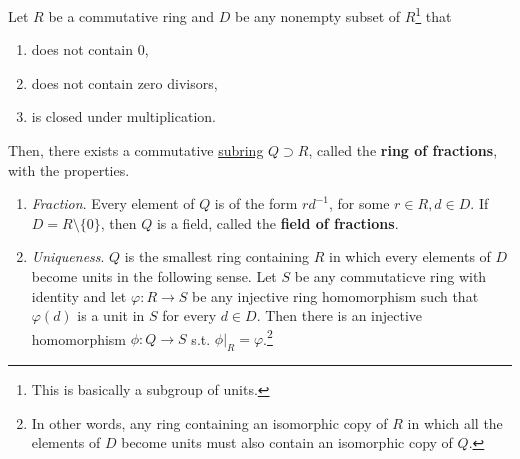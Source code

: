   \begin{definition}
    \label{def:ring-field-of-fractions}
    Let $R$ be a commutative ring and $D$ be any nonempty subset of $R$\footnote{This is basically a subgroup of units.} that 
    \begin{enumerate}
      \item does not contain $0$, 
      \item does not contain zero divisors, 
      \item is closed under multiplication. 
    \end{enumerate}
    Then, there exists a commutative \hyperref[def:subring]{subring} $Q \supset R$, called the \textbf{ring of fractions}, with the properties. 
    \begin{enumerate}
      \item \textit{Fraction}. Every element of $Q$ is of the form $r d^{-1}$, for some $r \in R, d \in D$. If $D = R \setminus \{0\}$, then $Q$ is a field, called the \textbf{field of fractions}. 
      \item \textit{Uniqueness}. $Q$ is the smallest ring containing $R$ in which every elements of $D$ become units in the following sense. Let $S$ be any commutaticve ring with identity and let $\varphi: R \to S$ be any injective ring homomorphism such that $\varphi(d)$ is a unit in $S$ for every $d \in D$. Then there is an injective homomorphism $\phi: Q \to S$ s.t. $\phi |_R = \varphi$.\footnote{In other words, any ring containing an isomorphic copy of $R$ in which all the elements of $D$ become units must also contain an isomorphic copy of $Q$.}
    \end{enumerate}
  \end{definition}
